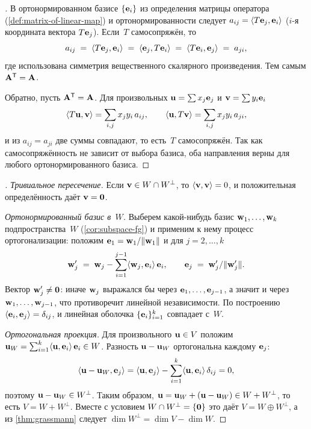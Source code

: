 \begin{proof}[]
В ортонормированном базисе $\{\mathbf{e}_i\}$ из определения матрицы
оператора (\cref{def:matrix-of-linear-map}) и
ортонормированности следует
$a_{ij} = \langle T\mathbf{e}_j, \mathbf{e}_i \rangle$ ($i$-я координата
вектора $T\mathbf{e}_j$). Если~$T$ самосопряжён, то
\[
  a_{ij} \;=\; \langle T\mathbf{e}_j, \mathbf{e}_i \rangle
  \;=\; \langle \mathbf{e}_j, T\mathbf{e}_i \rangle
  \;=\; \langle T\mathbf{e}_i, \mathbf{e}_j \rangle
  \;=\; a_{ji},
\]
где использована симметрия вещественного скалярного произведения. Тем
самым $\mathbf{A}^{\mathsf{T}} = \mathbf{A}$.

Обратно, пусть $\mathbf{A}^{\mathsf{T}} = \mathbf{A}$. Для произвольных
$\mathbf{u} = \sum x_j \mathbf{e}_j$ и $\mathbf{v} = \sum y_i \mathbf{e}_i$
\[
  \langle T\mathbf{u}, \mathbf{v} \rangle = \sum_{i, j} x_j y_i\, a_{ij},
  \qquad
  \langle \mathbf{u}, T\mathbf{v} \rangle = \sum_{i, j} x_j y_i\, a_{ji},
\]
и из $a_{ij} = a_{ji}$ две суммы совпадают, то есть~$T$ самосопряжён.
Так как самосопряжённость не зависит от выбора базиса, оба направления
верны для любого ортонормированного базиса.
\end{proof}

\begin{proof}[]
\emph{Тривиальное пересечение.} Если $\mathbf{v} \in W \cap W^{\perp}$,
то $\langle \mathbf{v}, \mathbf{v} \rangle = 0$, и положительная
определённость даёт $\mathbf{v} = \mathbf{0}$.

\emph{Ортонормированный базис в~$W$.} Выберем какой-нибудь базис
$\mathbf{w}_1, \dots, \mathbf{w}_k$ подпространства~$W$
(\cref{cor:subspace-fg}) и применим к нему процесс
ортогонализации: положим $\mathbf{e}_1 = \mathbf{w}_1 / \|\mathbf{w}_1\|$ и
для $j = 2, \dots, k$
\[
  \mathbf{w}'_j \;=\; \mathbf{w}_j - \sum_{i=1}^{j-1} \langle \mathbf{w}_j, \mathbf{e}_i \rangle\, \mathbf{e}_i,
  \qquad
  \mathbf{e}_j \;=\; \mathbf{w}'_j / \|\mathbf{w}'_j\|.
\]
Вектор $\mathbf{w}'_j \neq \mathbf{0}$: иначе $\mathbf{w}_j$ выражался бы
через $\mathbf{e}_1, \dots, \mathbf{e}_{j-1}$, а значит и через
$\mathbf{w}_1, \dots, \mathbf{w}_{j-1}$, что противоречит линейной
независимости. По построению $\langle \mathbf{e}_i, \mathbf{e}_j \rangle = \delta_{ij}$,
и линейная оболочка $\{\mathbf{e}_i\}_{i=1}^{k}$ совпадает с~$W$.

\emph{Ортогональная проекция.} Для произвольного $\mathbf{u} \in V$
положим
$\mathbf{u}_W = \sum_{i=1}^{k} \langle \mathbf{u}, \mathbf{e}_i \rangle\, \mathbf{e}_i \in W$.
Разность $\mathbf{u} - \mathbf{u}_W$ ортогональна каждому $\mathbf{e}_j$:
\[
  \langle \mathbf{u} - \mathbf{u}_W, \mathbf{e}_j \rangle
  = \langle \mathbf{u}, \mathbf{e}_j \rangle - \sum_{i=1}^{k} \langle \mathbf{u}, \mathbf{e}_i \rangle\, \delta_{ij}
  = 0,
\]
поэтому $\mathbf{u} - \mathbf{u}_W \in W^{\perp}$. Таким образом,
$\mathbf{u} = \mathbf{u}_W + (\mathbf{u} - \mathbf{u}_W) \in W + W^{\perp}$, то
есть $V = W + W^{\perp}$. Вместе с условием $W \cap W^{\perp} = \{\mathbf{0}\}$
это даёт $V = W \oplus W^{\perp}$, а из \cref{thm:grassmann}
следует $\dim W^{\perp} = \dim V - \dim W$.
\end{proof}

